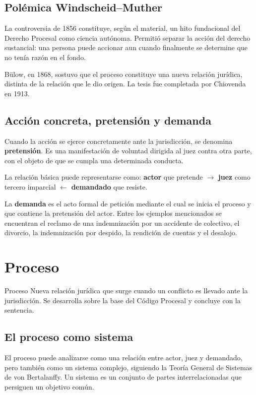 \documentclass[12pt,oneside]{book}
\begin{document}
\subsection{Polémica Windscheid--Muther}
La controversia de 1856 constituye, según el material, un hito fundacional del Derecho Procesal como ciencia autónoma. Permitió separar la acción del derecho sustancial: una persona puede accionar aun cuando finalmente se determine que no tenía razón en el fondo.

Bülow, en 1868, sostuvo que el proceso constituye una nueva relación jurídica, distinta de la relación que le dio origen. La tesis fue completada por Chiovenda en 1913.

\subsection{Acción concreta, pretensión y demanda}
Cuando la acción se ejerce concretamente ante la jurisdicción, se denomina \textbf{pretensión}. Es una manifestación de voluntad dirigida al juez contra otra parte, con el objeto de que se cumpla una determinada conducta.

\begin{important}
La relación básica puede representarse como: \textbf{actor} que pretende $\rightarrow$ \textbf{juez} como tercero imparcial $\leftarrow$ \textbf{demandado} que resiste.
\end{important}

La \textbf{demanda} es el acto formal de petición mediante el cual se inicia el proceso y que contiene la pretensión del actor. Entre los ejemplos mencionados se encuentran el reclamo de una indemnización por un accidente de colectivo, el divorcio, la indemnización por despido, la rendición de cuentas y el desalojo.

\section{Proceso}
\begin{definition}{Proceso}
Nueva relación jurídica que surge cuando un conflicto es llevado ante la jurisdicción. Se desarrolla sobre la base del Código Procesal y concluye con la sentencia.
\end{definition}

\subsection{El proceso como sistema}
El proceso puede analizarse como una relación entre actor, juez y demandado, pero también como un sistema complejo, siguiendo la Teoría General de Sistemas de von Bertalanffy. Un sistema es un conjunto de partes interrelacionadas que persiguen un objetivo común.
\end{document}
